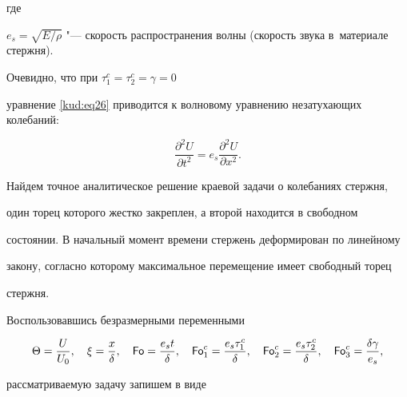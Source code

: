 где 

$e_s=\sqrt {E/\rho }$ "--- скорость распространения волны (скорость звука в~материале стержня).



Очевидно, что при $ \tau_1^c = \tau_2^c = \gamma =0$

уравнение \eqref{kud:eq26} приводится к волновому уравнению незатухающих колебаний:

\begin{equation}

\label{kud:eq27}

\frac{\partial^2U}{\partial t^2}=e_s\frac{\partial ^2U}{\partial x^2}.

\end{equation}



Найдем точное аналитическое решение краевой задачи о колебаниях стержня,

один торец которого жестко закреплен, а второй   находится в свободном

состоянии. В начальный момент времени стержень деформирован по линейному

закону, согласно которому максимальное перемещение имеет свободный торец

стержня. 



Воспользовавшись безразмерными переменными

\begin{equation}

\label{kud:eq28}

\Theta=\frac{U}{U_0}, \quad  

\xi=\frac{x}{ \delta},\quad 

\operatorname{\sf Fo}=\frac{e_st}{ \delta},\quad 

\operatorname{\sf Fo}_1^c =\frac{e_s \tau_ 1^c }{\delta},\quad 

\operatorname{\sf Fo}_2^c =\frac{e_s \tau_2^c }{\delta},\quad 

\operatorname{\sf Fo}_3^c =\frac{\delta \gamma}{e_s},

\end{equation}

рассматриваемую задачу запишем в виде

